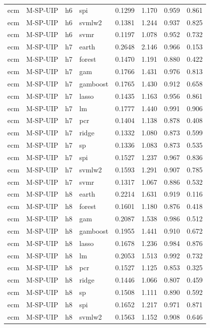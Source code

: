 \begin{ThreePartTable}
\begin{longtable}[t]{llclcccc}
ecm & M-SP-UIP & h6 & spi & 0.1299 & 1.170 & 0.959 & 0.861\\
ecm & M-SP-UIP & h6 & svmlw2 & 0.1381 & 1.244 & 0.937 & 0.825\\
ecm & M-SP-UIP & h6 & svmr & 0.1197 & 1.078 & 0.952 & 0.732\\
\addlinespace
ecm & M-SP-UIP & h7 & earth & 0.2648 & 2.146 & 0.966 & 0.153\\
ecm & M-SP-UIP & h7 & forest & 0.1470 & 1.191 & 0.880 & 0.422\\
ecm & M-SP-UIP & h7 & gam & 0.1766 & 1.431 & 0.976 & 0.813\\
ecm & M-SP-UIP & h7 & gamboost & 0.1765 & 1.430 & 0.912 & 0.658\\
ecm & M-SP-UIP & h7 & lasso & 0.1435 & 1.163 & 0.956 & 0.861\\
ecm & M-SP-UIP & h7 & lm & 0.1777 & 1.440 & 0.991 & 0.906\\
ecm & M-SP-UIP & h7 & pcr & 0.1404 & 1.138 & 0.878 & 0.408\\
ecm & M-SP-UIP & h7 & ridge & 0.1332 & 1.080 & 0.873 & 0.599\\
ecm & M-SP-UIP & h7 & sp & 0.1336 & 1.083 & 0.873 & 0.535\\
ecm & M-SP-UIP & h7 & spi & 0.1527 & 1.237 & 0.967 & 0.836\\
ecm & M-SP-UIP & h7 & svmlw2 & 0.1593 & 1.291 & 0.907 & 0.785\\
ecm & M-SP-UIP & h7 & svmr & 0.1317 & 1.067 & 0.886 & 0.532\\
\addlinespace
ecm & M-SP-UIP & h8 & earth & 0.2214 & 1.631 & 0.919 & 0.116\\
ecm & M-SP-UIP & h8 & forest & 0.1601 & 1.180 & 0.876 & 0.418\\
ecm & M-SP-UIP & h8 & gam & 0.2087 & 1.538 & 0.986 & 0.512\\
ecm & M-SP-UIP & h8 & gamboost & 0.1955 & 1.441 & 0.910 & 0.672\\
ecm & M-SP-UIP & h8 & lasso & 0.1678 & 1.236 & 0.984 & 0.876\\
ecm & M-SP-UIP & h8 & lm & 0.2053 & 1.513 & 0.992 & 0.732\\
ecm & M-SP-UIP & h8 & pcr & 0.1527 & 1.125 & 0.853 & 0.325\\
ecm & M-SP-UIP & h8 & ridge & 0.1446 & 1.066 & 0.807 & 0.459\\
ecm & M-SP-UIP & h8 & sp & 0.1508 & 1.111 & 0.890 & 0.592\\
ecm & M-SP-UIP & h8 & spi & 0.1652 & 1.217 & 0.971 & 0.871\\
ecm & M-SP-UIP & h8 & svmlw2 & 0.1563 & 1.152 & 0.908 & 0.646\\

\end{longtable}
\end{ThreePartTable}
